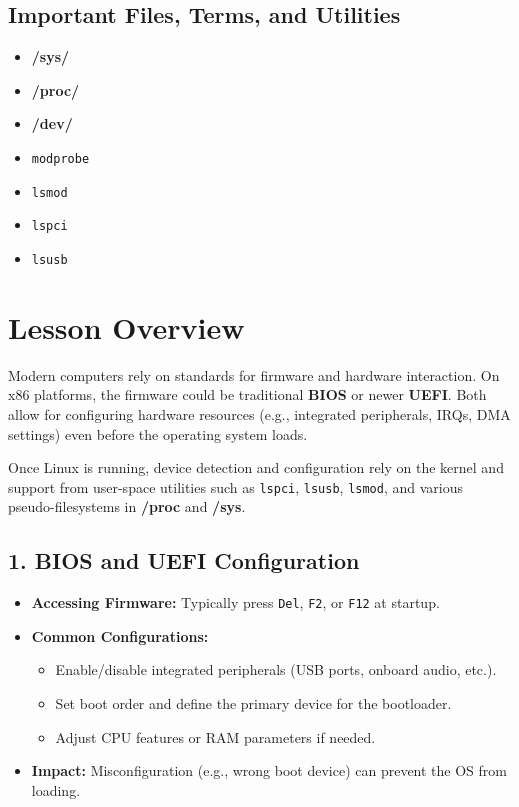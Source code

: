 \documentclass[12pt,a4paper]{report}
\begin{document}
\subsection*{Important Files, Terms, and Utilities}
\begin{itemize}
    \item \textbf{/sys/}
    \item \textbf{/proc/}
    \item \textbf{/dev/}
    \item \texttt{modprobe}
    \item \texttt{lsmod}
    \item \texttt{lspci}
    \item \texttt{lsusb}
\end{itemize}

\section*{Lesson Overview}

Modern computers rely on standards for firmware and hardware interaction. On x86 platforms, the firmware could be traditional \textbf{BIOS} or newer \textbf{UEFI}. Both allow for configuring hardware resources (e.g., integrated peripherals, IRQs, DMA settings) even before the operating system loads.

Once Linux is running, device detection and configuration rely on the kernel and support from user-space utilities such as \texttt{lspci}, \texttt{lsusb}, \texttt{lsmod}, and various pseudo-filesystems in \textbf{/proc} and \textbf{/sys}.

\subsection*{1. BIOS and UEFI Configuration}
\begin{itemize}
    \item \textbf{Accessing Firmware:} Typically press \texttt{Del}, \texttt{F2}, or \texttt{F12} at startup.
    \item \textbf{Common Configurations:}
    \begin{itemize}
        \item Enable/disable integrated peripherals (USB ports, onboard audio, etc.).
        \item Set boot order and define the primary device for the bootloader.
        \item Adjust CPU features or RAM parameters if needed.
    \end{itemize}
    \item \textbf{Impact:} Misconfiguration (e.g., wrong boot device) can prevent the OS from loading.
\end{itemize}
\end{document}
